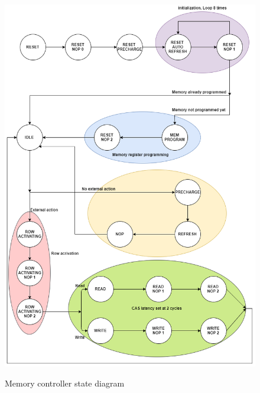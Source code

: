 \begin{figure}[H]
\centering
\includegraphics[scale=.6]{Immagini/26}
\label{26}
\caption{Memory controller state diagram}
\end{figure}

